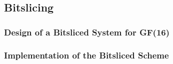 \subsection{Bitslicing} \label{opt:bitslice}
\subsubsection{Design of a Bitsliced System for GF(16)} \label{bitslice:theory}
\subsubsection{Implementation of the Bitsliced Scheme} \label{bitslice:implementation}